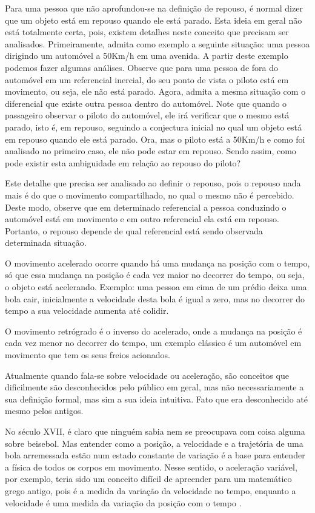 \documentclass[
	12pt,				%
	openright,			%
    twoside,			%
	a4paper,			%
	chapter=TITLE,		%
	english,			%
	french,				%
	spanish,			%
	brazil				%
	]{abntex2}
\numberwithin{lema}{chapter}
\numberwithin{teorema}{chapter}
\numberwithin{definicao}{chapter}
\numberwithin{exemplo}{chapter}
\numberwithin{figure}{chapter}
\begin{document}
Para uma pessoa que não aprofundou-se na definição de repouso, é normal dizer que um objeto está em repouso quando ele está parado. Esta ideia em geral não está totalmente certa, pois, existem detalhes neste conceito que precisam ser analisados. Primeiramente, admita como exemplo a seguinte situação: uma pessoa dirigindo um automóvel a 50Km/h em uma avenida. A partir deste exemplo podemos fazer algumas análises. Observe que para uma pessoa de fora do automóvel em um referencial inercial, do seu ponto de vista o piloto está em movimento, ou seja, ele não está parado. Agora, admita a mesma situação com o diferencial que existe outra pessoa dentro do automóvel. Note que quando o passageiro observar o piloto do automóvel, ele irá verificar que o mesmo está parado, isto é, em repouso, seguindo a conjectura inicial no qual um objeto está em repouso quando ele está parado. Ora, mas o piloto está a 50Km/h e como foi analisado no primeiro caso, ele não pode estar em repouso. Sendo assim, como pode existir esta ambiguidade em relação ao repouso do piloto?

Este detalhe que precisa ser analisado ao definir o repouso, pois o repouso nada mais é do que o movimento compartilhado, no qual o mesmo não é percebido. Deste modo, observe que em determinado referencial a pessoa conduzindo o automóvel está em movimento e em outro referencial ela está em repouso. Portanto, o repouso depende de qual referencial está sendo observada determinada situação. 

O movimento acelerado ocorre quando há uma mudança na posição com o tempo, só que essa mudança na posição é cada vez maior no decorrer do tempo, ou seja, o objeto está acelerando. Exemplo: uma pessoa em cima de um prédio deixa uma bola cair, inicialmente a velocidade desta bola é igual a zero, mas no decorrer do tempo a sua velocidade aumenta até colidir. 

O movimento retrógrado é o inverso do acelerado, onde a mudança na posição é cada vez menor no decorrer do tempo, um exemplo clássico é um automóvel em movimento que tem os seus freios acionados.

Atualmente quando fala-se sobre velocidade ou aceleração, são conceitos que dificilmente são desconhecidos pelo público em geral, mas não necessariamente a sua definição formal, mas sim a sua ideia intuitiva. Fato que era desconhecido até mesmo pelos antigos. 

\begin{citacao}
	No século XVII, é claro que ninguém sabia nem se preocupava com coisa alguma sobre beisebol. Mas entender como a posição, a velocidade e a trajetória de uma bola arremessada estão num estado constante de variação é a base para entender a física de todos os corpos em movimento. Nesse sentido, o aceleração variável, por exemplo, teria sido um conceito difícil de apreender para um matemático grego antigo, pois é a medida da variação da velocidade no tempo, enquanto a velocidade é uma medida da variação da posição com o tempo \cite[p. 23]{bardi}.
\end{citacao}
\end{document}

